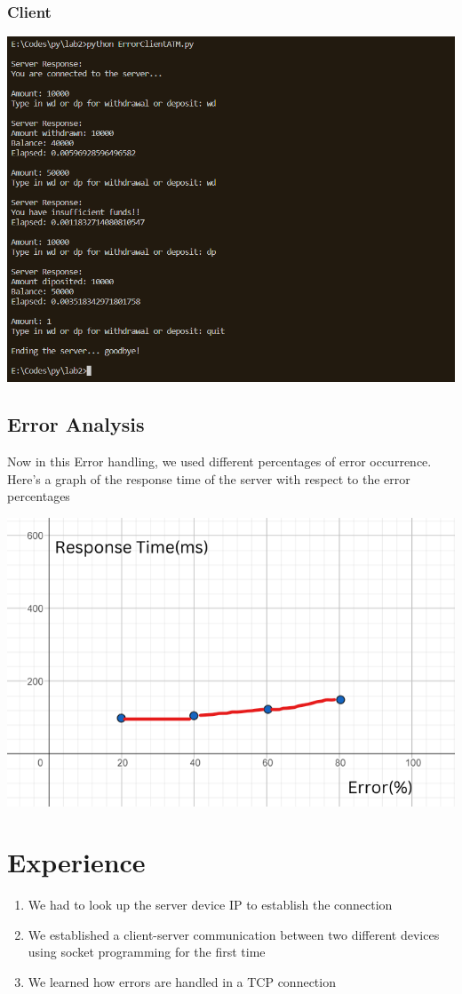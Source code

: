 \documentclass[11pt]{article}
\begin{document}
        \subsubsection{Client}
        \includegraphics[width=\textwidth]{ErrorClient.png}
    \subsection{Error Analysis}
    Now in this Error handling, we used different percentages of error occurrence. Here's a graph of the response time of the server with respect to the error percentages
    
        \includegraphics[width=\textwidth]{graph.png}

\section{Experience}
\begin{enumerate}
    \item We had to look up the server device IP to establish the connection
    \item We established a client-server communication between two different devices using socket programming for the first time
    \item We learned how errors are handled in a TCP connection
\end{enumerate}
\end{document}

